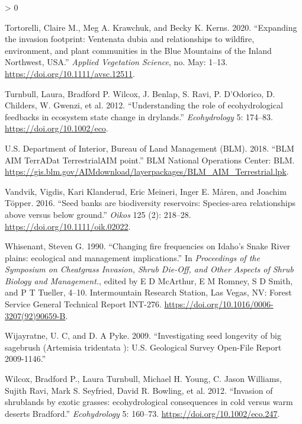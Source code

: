 \documentclass[
  12pt,
]{article}
\newlength{\cslhangindent}
\newenvironment{CSLReferences}[2] %
 {%
  \setlength{\parindent}{0pt}
  \ifodd #1 \everypar{\setlength{\hangindent}{\cslhangindent}}\ignorespaces\fi
  \ifnum #2 > 0
  \setlength{\parskip}{#2\baselineskip}
  \fi
 }%
 {}
\begin{document}
\begin{CSLReferences}{1}{0}
\leavevmode\hypertarget{ref-Tortorelli2020}{}%
Tortorelli, Claire M., Meg A. Krawchuk, and Becky K. Kerns. 2020.
{``{Expanding the invasion footprint: Ventenata dubia and relationships
to wildfire, environment, and plant communities in the Blue Mountains of
the Inland Northwest, USA}.''} \emph{Applied Vegetation Science}, no.
May: 1--13. \url{https://doi.org/10.1111/avsc.12511}.

\leavevmode\hypertarget{ref-Turnbull2012}{}%
Turnbull, Laura, Bradford P. Wilcox, J. Benlap, S. Ravi, P. D'Odorico,
D. Childers, W. Gwenzi, et al. 2012. {``{Understanding the role of
ecohydrological feedbacks in ecosystem state change in drylands}.''}
\emph{Ecohydrology} 5: 174--83. \url{https://doi.org/10.1002/eco}.

\leavevmode\hypertarget{ref-AIM}{}%
U.S. Department of Interior, Bureau of Land Management (BLM). 2018.
{``{BLM AIM TerrADat TerrestrialAIM point}.''} BLM National Operations
Center: BLM.
\url{https://gis.blm.gov/AIMdownload/layerpackages/BLM_AIM_Terrestrial.lpk}.

\leavevmode\hypertarget{ref-Vandvik2016}{}%
Vandvik, Vigdis, Kari Klanderud, Eric Meineri, Inger E. Måren, and
Joachim Töpper. 2016. {``{Seed banks are biodiversity reservoirs:
Species-area relationships above versus below ground}.''} \emph{Oikos}
125 (2): 218--28. \url{https://doi.org/10.1111/oik.02022}.

\leavevmode\hypertarget{ref-Whisenant1990}{}%
Whisenant, Steven G. 1990. {``{Changing fire frequencies on Idaho's
Snake River plains: ecological and management implications}.''} In
\emph{Proceedings of the Symposium on Cheatgrass Invasion, Shrub
Die-Off, and Other Aspects of Shrub Biology and Management.}, edited by
E D McArthur, E M Romney, S D Smith, and P T Tueller, 4--10.
Intermountain Research Station, Las Vegas, NV: Forest Service General
Technical Report INT-276.
\url{https://doi.org/10.1016/0006-3207(92)90659-B}.

\leavevmode\hypertarget{ref-Wijayratne2009}{}%
Wijayratne, U. C, and D. A Pyke. 2009. {``{Investigating seed longevity
of big sagebrush (Artemisia tridentata ): U.S. Geological Survey
Open-File Report 2009-1146}.''}

\leavevmode\hypertarget{ref-Wilcox2012}{}%
Wilcox, Bradford P., Laura Turnbull, Michael H. Young, C. Jason
Williams, Sujith Ravi, Mark S. Seyfried, David R. Bowling, et al. 2012.
{``{Invasion of shrublands by exotic grasses: ecohydrological
consequences in cold versus warm deserts Bradford}.''}
\emph{Ecohydrology} 5: 160--73. \url{https://doi.org/10.1002/eco.247}.


\end{CSLReferences}
\end{document}
